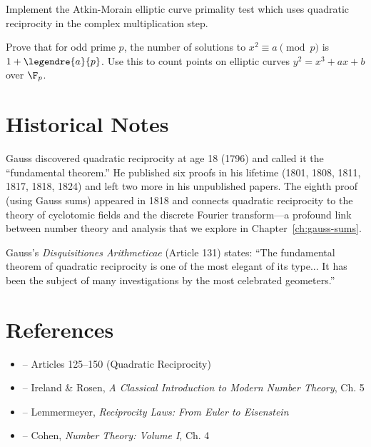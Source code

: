 \begin{exercise}
Implement the Atkin-Morain elliptic curve primality test which uses quadratic reciprocity in the complex multiplication step.
\end{exercise}

\begin{exercise}
Prove that for odd prime $p$, the number of solutions to $x^2 \equiv a \pmod{p}$ is $1 + \legendre{a}{p}$. Use this to count points on elliptic curves $y^2 = x^3 + ax + b$ over $\F_p$.
\end{exercise}

\section{Historical Notes}

Gauss discovered quadratic reciprocity at age 18 (1796) and called it the ``fundamental theorem.'' He published six proofs in his lifetime (1801, 1808, 1811, 1817, 1818, 1824) and left two more in his unpublished papers. The eighth proof (using Gauss sums) appeared in 1818 and connects quadratic reciprocity to the theory of cyclotomic fields and the discrete Fourier transform---a profound link between number theory and analysis that we explore in Chapter~\ref{ch:gauss-sums}.

Gauss's \textit{Disquisitiones Arithmeticae} (Article 131) states: ``The fundamental theorem of quadratic reciprocity is one of the most elegant of its type... It has been the subject of many investigations by the most celebrated geometers.''

\section{References}

\begin{itemize}
    \item \cite{gauss-disq} -- Articles 125--150 (Quadratic Reciprocity)
    \item \cite{ireland-rosen} -- Ireland \& Rosen, \textit{A Classical Introduction to Modern Number Theory}, Ch. 5
    \item \cite{lemmermeyer-reciprocity} -- Lemmermeyer, \textit{Reciprocity Laws: From Euler to Eisenstein}
    \item \cite{cohen-number-theory} -- Cohen, \textit{Number Theory: Volume I}, Ch. 4
\end{itemize}